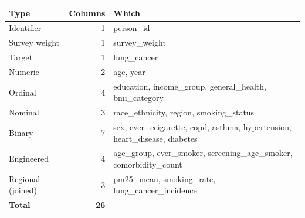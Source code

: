 \begin{tabularx}{\textwidth}{l r >{\raggedright\arraybackslash}X}
\toprule
Type & Columns & Which \\
\midrule
Identifier & 1 & person\_id \\
Survey weight & 1 & survey\_weight \\
Target & 1 & lung\_cancer \\
Numeric & 2 & age, year \\
Ordinal & 4 & education, income\_group, general\_health, bmi\_category \\
Nominal & 3 & race\_ethnicity, region, smoking\_status \\
Binary & 7 & sex, ever\_ecigarette, copd, asthma, hypertension, heart\_disease, diabetes \\
Engineered & 4 & age\_group, ever\_smoker, screening\_age\_smoker, comorbidity\_count \\
Regional (joined) & 3 & pm25\_mean, smoking\_rate, lung\_cancer\_incidence \\
\midrule
\textbf{Total} & \textbf{26} &  \\
\bottomrule
\end{tabularx}
